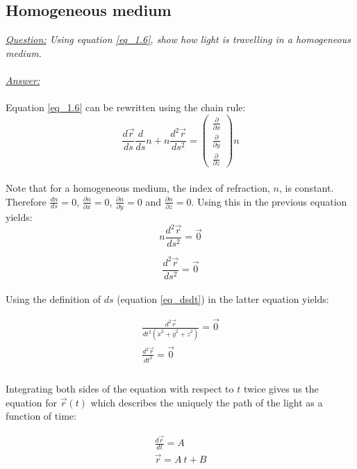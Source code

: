 \documentclass{article}
\def\Nabla{
	\begin{pmatrix}
		\frac{\partial}{\partial {x}} \\
		\frac{\partial}{\partial {y}} \\
		\frac{\partial}{\partial {z}}
	\end{pmatrix}}
\begin{document}
\subsection{Homogeneous medium}

\textit{\underline{Question:} Using equation \ref{eq_1.6}, show how light is travelling in a homogeneous medium.}\\
\\
\textit{\underline{Answer:}} \\
\\
Equation \ref{eq_1.6} can be rewritten using the chain rule: \\

\begin{equation*}
	\frac{d \vec{r}}{ds} \frac{d}{ds} n + n \frac{d^2 \vec{r}}{ds^2} = \Nabla n
\end{equation*} \\

Note that for a homogeneous medium, the index of refraction, $n$, is constant. Therefore $\frac{dn}{ds} = 0$, $\frac{\partial n}{\partial x} = 0$, $\frac{\partial n}{\partial y} = 0$ and $\frac{\partial n}{\partial z} = 0$. Using this in the previous equation yields: \\

\begin{equation*}
	 n \frac{d^2 \vec{r}}{ds^2} = \vec{0}
\end{equation*}

\begin{equation*}
	 \frac{d^2 \vec{r}}{ds^2} = \vec{0}
\end{equation*} \\

Using the definition of $ds$ (equation \ref{eq_dsdt}) in the latter equation yields:

\begin{align*}
	 \frac{d^2 \vec{r}}{dt^2 (\dot{x}^2+\dot{y}^2+\dot{z}^2)} = \vec{0} \\
	 \frac{d^2 \vec{r}}{dt^2} = \vec{0} \\
\end{align*} \\

Integrating both sides of the equation with respect to $t$ twice gives us the equation for $\vec{r}(t)$ which describes the uniquely the path of the light as a function of time:

\begin{align*}
	 \frac{d \vec{r}}{dt} = A \\
	 \vec{r} = A \: t + B
\end{align*} \\
\end{document}

